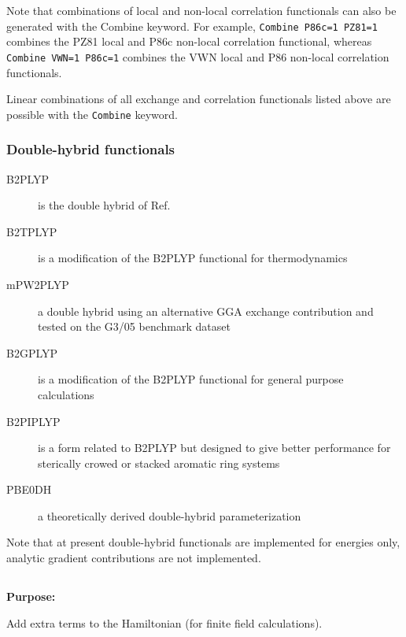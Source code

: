 Note that combinations of local and non-local correlation functionals
can also be generated with the Combine keyword. For example,
\verb|Combine P86c=1 PZ81=1| combines the PZ81 local and P86c non-local 
correlation functional, whereas \verb|Combine VWN=1 P86c=1| 
combines the VWN local and P86 non-local correlation functionals.


Linear combinations of all exchange and correlation functionals listed above
are possible with the \verb|Combine| keyword.

\subsubsection{Double-hybrid functionals}
\begin{description}
\item[B2PLYP] is the double hybrid of Ref.~\cite{dft:b2plyp}

\item[B2TPLYP] is a modification of the B2PLYP functional for thermodynamics~\cite{dft:b2tplyp}

\item[mPW2PLYP] a double hybrid using an alternative GGA exchange contribution and tested on the G3/05 benchmark dataset~\cite{dft:mpw2plyp}

\item[B2GPLYP] is a modification of the B2PLYP functional for general purpose calculations~\cite{dft:b2tplyp}

\item[B2PIPLYP] is a form related to B2PLYP but designed to give better performance for sterically crowed or stacked aromatic ring systems~\cite{dft:b2piplyp}

\item[PBE0DH] a theoretically derived double-hybrid parameterization~\cite{dft:pbe0dh}

\end{description}

Note that at present double-hybrid functionals are implemented for energies only, analytic gradient contributions are not implemented.

\pagebreak[3]
\subsection{\label{ref-haminp}}

{\bf Purpose:}

Add extra terms to the Hamiltonian (for finite field calculations).

